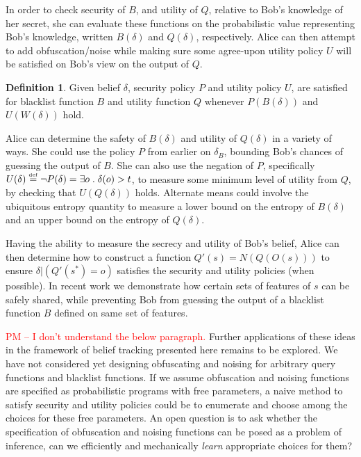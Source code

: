 \documentclass{article} %
\newcommand{\pxm}[1]{\textcolor{red}{PM -- #1}}
\newcommand{\asecret}[0]{s}
\newcommand{\rsecret}[0]{\asecret^*}
\newcommand{\paren}[1]{\left( #1 \right)}
\newcommand{\cond}[0]{|}
\newcommand{\qsep}[0]{\; . \;}
\newcommand{\stacklabel}[1]{\stackrel{\smash{\scriptscriptstyle \mathrm{#1}}}}
\newcommand{\defeq}{\stacklabel{def}=}
\theoremstyle{plain} %
\theoremstyle{definition} %
\newtheorem*{definition-un}{Definition}
\begin{document}
In order to check security of $ B $, and utility of $ Q $, relative
to Bob's knowledge of her secret, she can evaluate these functions on
the probabilistic value representing Bob's knowledge, written $
B(\delta) $ and $ Q(\delta) $, respectively. Alice can then attempt to
add obfuscation/noise while making sure some agree-upon utility policy
$ U $ will be satisfied on Bob's view on the output of $ Q $.

\begin{definition-un}
Given belief $ \delta $, security policy $ P $ and utility policy $ U
$, are satisfied for blacklist function $ B $ and utility function $ Q
$ whenever $P(B(\delta))$ and $U(W(\delta))$ hold. 
\end{definition-un}

Alice can determine the safety of $ B(\delta) $ and utility of $
Q(\delta) $ in a variety of ways. She could use the policy $ P $ from
earlier on $ \delta_B $, bounding Bob's chances of guessing the output
of $ B $. She can also use the negation of $ P $, specifically $
U(\delta) \defeq \neg P(\delta) = \exists o \qsep \delta(o) > t $, to
measure some minimum level of utility from $ Q $, by checking that $
U(Q(\delta)) $ holds. Alternate means could involve the ubiquitous
entropy quantity to measure a lower bound on the entropy of $ B(\delta)
$ and an upper bound on the entropy of $ Q(\delta) $.


Having the ability to measure the secrecy and utility of Bob's belief,
Alice can then determine how to construct a function $ Q'(\asecret) =
N(Q(O(\asecret))) $ to ensure $ \delta \cond \paren{Q'(\rsecret) = o}
$ satisfies the security and utility policies (when possible).  In
recent work \cite{chakraborty12balancing} we demonstrate how certain
sets of features of $ \asecret $ can be safely shared, while
preventing Bob from guessing the output of a blacklist function $ B $
defined on same set of features.

\pxm{I don't understand the below paragraph.}  Further applications of
these ideas in the framework of belief tracking presented here remains
to be explored. We have not considered yet designing obfuscating and
noising for arbitrary query functions and blacklist functions.  If we
assume obfuscation and noising functions are specified as
probabilistic programs with free parameters, a naive method to satisfy
security and utility policies could be to enumerate and choose among
the choices for these free parameters.  An open question is to ask
whether the specification of obfuscation and noising functions can be
posed as a problem of inference, can we efficiently and mechanically
\emph{learn} appropriate choices for them?  
\end{document}
